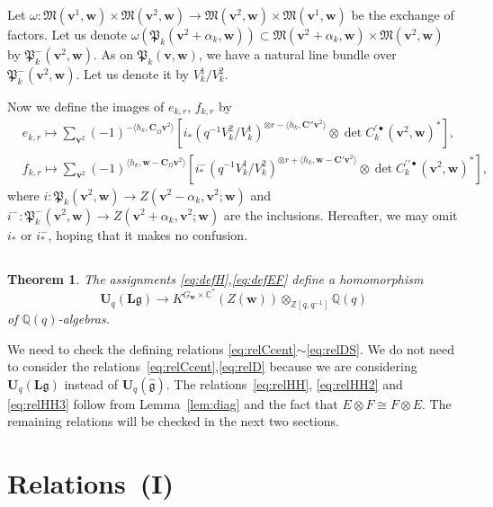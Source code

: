 \documentclass[12pt]{amsart}
\def\Bbb{\mathbb}
\def\frak{\mathfrak}
\newtheorem{Theorem}[equation]{Theorem}
\theoremstyle{definition}
\theoremstyle{remark}
\numberwithin{equation}{subsection}
\newcommand{\lemref}[1]{Lemma~\ref{#1}}
\newcommand{\C}{{\Bbb C}}
\newcommand{\Z}{{\Bbb Z}}
\newcommand{\Q}{{\Bbb Q}}
\newcommand{\M}{{\frak M}} %
\newcommand{\bv}{{\mathbf v}} %
\newcommand{\bw}{{\mathbf w}} %
\newcommand{\bC}{{\mathbf C}} %
\newcommand{\Ua}{{\mathbf U}_q(\widehat{\mathfrak g})} %
\newcommand{\Ul}{{\mathbf U}_q({\mathbf L}{\mathfrak g})} %
\newcommand{\Pa}{{\frak P}} %
\newcommand{\Zw}{Z(\bw)}
\begin{document}
Let $\omega\colon \M(\bv^1,\bw)\times\M(\bv^2,\bw)
\to \M(\bv^2,\bw)\times\M(\bv^1,\bw)$ be the exchange of factors.
%
Let us denote
$\omega\left(\Pa_k(\bv^2+\alpha_k,\bw)\right)
\subset \M(\bv^2+\alpha_k,\bw)\times\M(\bv^2,\bw)$ by
$\Pa_k^-(\bv^2,\bw)$.
As on $\Pa_k(\bv,\bw)$, we have a natural line bundle over
$\Pa_k^-(\bv^2,\bw)$. Let us denote it by
$V^1_k/V^2_k$.

Now we define the images of $e_{k,r}$, $f_{k,r}$ by
\begin{equation}
\label{eq:defEF}
\begin{split}
  & e_{k,r} \longmapsto 
  \sum_{\bv^2} (-1)^{-\langle h_k, \bC_{\overline\Omega}\bv^2\rangle}
  \left[ i_* \left(q^{-1}V_k^2/V_k^1\right)^{\otimes r-\langle h_k,
  \bC''\bv^2\rangle}
  \otimes
  \det C_k^{\prime\bullet}(\bv^2,\bw)^*\right], \\
  & f_{k,r} \longmapsto 
  \sum_{\bv^2} (-1)^{\langle h_k, \bw - \bC_\Omega\bv^2\rangle}
  \left[ i^-_* \left(q^{-1}V_k^1/V_k^2\right)^{\otimes r+\langle h_k,
    \bw-\bC'\bv^2\rangle}
  \otimes
  \det C_k^{\prime\prime\bullet}(\bv^2,\bw)^*\right],
\end{split}
\end{equation}
where $i\colon \Pa_k(\bv^2,\bw)\to Z(\bv^2-\alpha_k,\bv^2;\bw)$
and $i^-\colon \Pa^-_k(\bv^2,\bw)\to Z(\bv^2+\alpha_k,\bv^2;\bw)$
are the inclusions.
Hereafter, we may omit $i_*$ or $i^-_*$, hoping that it makes no confusion.

\subsection{}

\begin{Theorem}\label{thm:hommain}
The assignments \eqref{eq:defH},\eqref{eq:defEF} define a homomorphism 
\[
   \Ul \to %
   K^{G_\bw\times\C^*}(\Zw)\otimes_{\Z[q,q^{-1}]}\Q(q)
\]
of $\Q(q)$-algebras. 
\end{Theorem}

We need to check the defining relations
\eqref{eq:relCcent}$\sim$\eqref{eq:relDS}.
We do not need to consider the
relations~\eqref{eq:relCcent},\eqref{eq:relD} because we are
considering $\Ul$ instead of $\Ua$.
The relations~\eqref{eq:relHH}, \eqref{eq:relHH2} and \eqref{eq:relHH3}
follow from \lemref{lem:diag} and the fact
that $E \otimes F\cong F\otimes E$.
The remaining relations will be checked in the next two sections.

\section{Relations~(I)}\label{sec:rel1}
\end{document}
